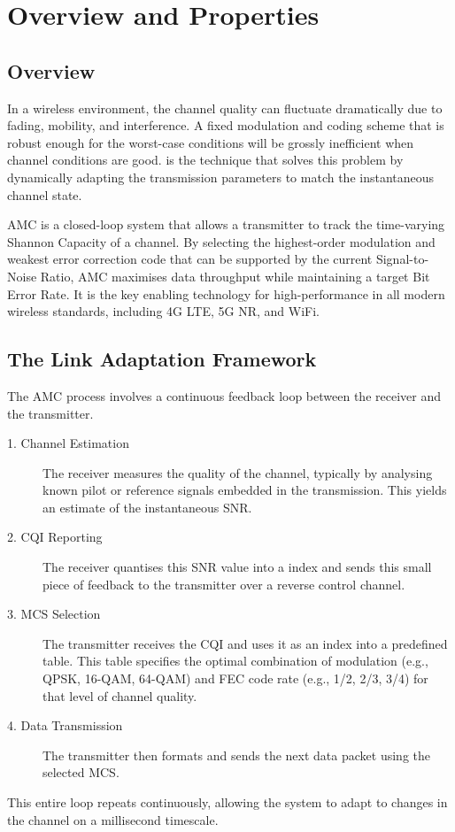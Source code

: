 \section{Overview and Properties}

\subsection{Overview}

In a wireless environment, the channel quality can fluctuate dramatically due to fading, mobility, and interference. A fixed modulation and coding scheme that is robust enough for the worst-case conditions will be grossly inefficient when channel conditions are good.  is the technique that solves this problem by dynamically adapting the transmission parameters to match the instantaneous channel state.

\begin{keyconcept}
    AMC is a closed-loop system that allows a transmitter to track the time-varying Shannon Capacity of a channel. By selecting the highest-order modulation and weakest error correction code that can be supported by the current Signal-to-Noise Ratio, AMC maximises data throughput while maintaining a target Bit Error Rate. It is the key enabling technology for high-performance in all modern wireless standards, including 4G LTE, 5G NR, and WiFi.
\end{keyconcept}


\subsection{The Link Adaptation Framework}

The AMC process involves a continuous feedback loop between the receiver and the transmitter.
\begin{description}
    \item[1. Channel Estimation] The receiver measures the quality of the channel, typically by analysing known pilot or reference signals embedded in the transmission. This yields an estimate of the instantaneous SNR.
    \item[2. CQI Reporting] The receiver quantises this SNR value into a  index and sends this small piece of feedback to the transmitter over a reverse control channel.
    \item[3. MCS Selection] The transmitter receives the CQI and uses it as an index into a predefined  table. This table specifies the optimal combination of modulation (e.g., QPSK, 16-QAM, 64-QAM) and FEC code rate (e.g., 1/2, 2/3, 3/4) for that level of channel quality.
    \item[4. Data Transmission] The transmitter then formats and sends the next data packet using the selected MCS.
\end{description}
This entire loop repeats continuously, allowing the system to adapt to changes in the channel on a millisecond timescale.


